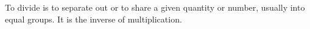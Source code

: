 To divide is to separate out or to share a given
quantity or number, usually into equal groups.
It is the inverse of multiplication.